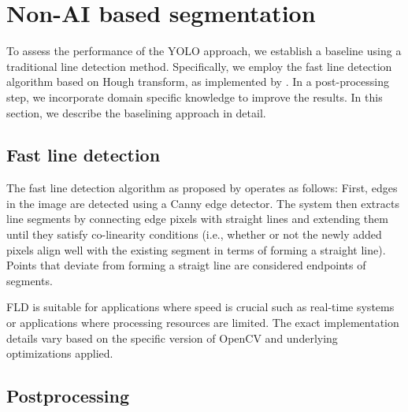 \documentclass[Master,MDS,english]{BASE/twbook} %
\begin{document}
\section{Non-AI based segmentation}

To assess the performance of the YOLO approach, we establish a baseline using a traditional line detection method. Specifically, we employ the fast line detection algorithm based on Hough transform, as implemented by \cite{FLD}. In a post-processing step, we incorporate domain specific knowledge to improve the results.
In this section, we describe the baselining approach in detail.
 
 \subsection{Fast line detection}


The fast line detection algorithm as proposed by \cite{fld_inproceedings} operates as follows: 
First, edges in the image are detected using a Canny edge detector. The system then extracts line segments by connecting edge pixels with straight lines and extending them until they satisfy co-linearity conditions (i.e., whether or not the newly added pixels align well with the existing segment in terms of forming a straight line). Points that deviate from forming a straigt line are considered endpoints of segments. 

FLD is suitable for applications where speed is crucial such as real-time systems or applications where processing resources are limited.
The exact implementation details vary based on the specific version of OpenCV and underlying optimizations applied.

\subsection{Postprocessing}
\end{document}
